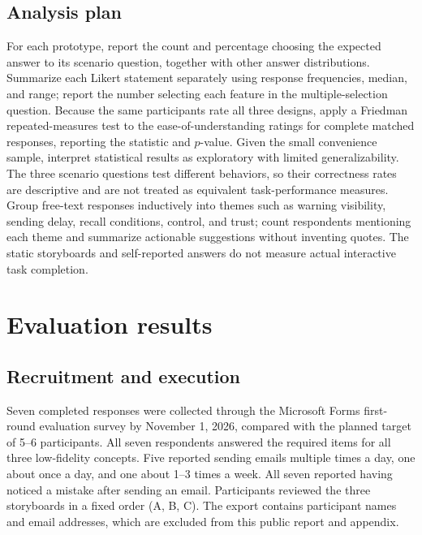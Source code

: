 \documentclass[letterpaper]{jdf}
\begin{document}
\subsection{Analysis plan}
For each prototype, report the count and percentage choosing the expected answer to its scenario question, together with other answer distributions. Summarize each Likert statement separately using response frequencies, median, and range; report the number selecting each feature in the multiple-selection question. Because the same participants rate all three designs, apply a Friedman repeated-measures test to the ease-of-understanding ratings for complete matched responses, reporting the statistic and $p$-value. Given the small convenience sample, interpret statistical results as exploratory with limited generalizability. The three scenario questions test different behaviors, so their correctness rates are descriptive and are not treated as equivalent task-performance measures. Group free-text responses inductively into themes such as warning visibility, sending delay, recall conditions, control, and trust; count respondents mentioning each theme and summarize actionable suggestions without inventing quotes. The static storyboards and self-reported answers do not measure actual interactive task completion.

\section{Evaluation results}
\subsection{Recruitment and execution}
Seven completed responses were collected through the Microsoft Forms first-round evaluation survey by November 1, 2026, compared with the planned target of 5--6 participants. All seven respondents answered the required items for all three low-fidelity concepts. Five reported sending emails multiple times a day, one about once a day, and one about 1--3 times a week. All seven reported having noticed a mistake after sending an email. Participants reviewed the three storyboards in a fixed order (A, B, C). The export contains participant names and email addresses, which are excluded from this public report and appendix.
\end{document}
